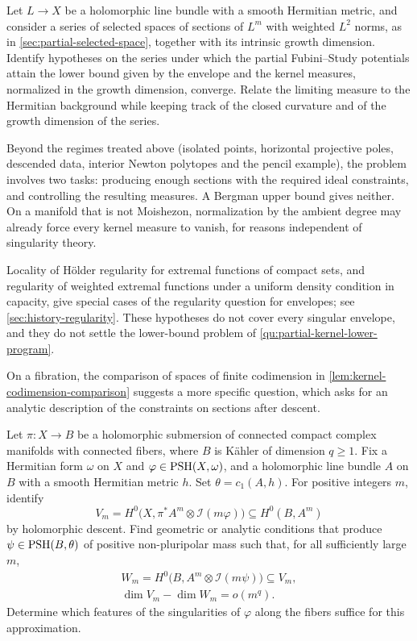 \begin{problem}\label{qu:partial-kernel-lower-program}
Let $L\to X$ be a holomorphic line bundle with a smooth Hermitian metric, and consider a series of selected spaces of sections of $L^m$ with weighted $L^2$ norms, as in \cref{sec:partial-selected-space}, together with its intrinsic growth dimension. Identify hypotheses on the series under which the partial Fubini--Study potentials attain the lower bound given by the envelope and the kernel measures, normalized in the growth dimension, converge. Relate the limiting measure to the Hermitian background while keeping track of the closed curvature and of the growth dimension of the series.
\end{problem}

Beyond the regimes treated above (isolated points, horizontal projective poles, descended data, interior Newton polytopes and the pencil example), the problem involves two tasks: producing enough sections with the required ideal constraints, and controlling the resulting measures. A Bergman upper bound gives neither. On a manifold that is not Moishezon, normalization by the ambient degree may already force every kernel measure to vanish, for reasons independent of singularity theory.

Locality of H\"older regularity for extremal functions of compact sets, and regularity of weighted extremal functions under a uniform density condition in capacity, give special cases of the regularity question for envelopes; see \cref{sec:history-regularity}. These hypotheses do not cover every singular envelope, and they do not settle the lower-bound problem of \cref{qu:partial-kernel-lower-program}.

On a fibration, the comparison of spaces of finite codimension in \cref{lem:kernel-codimension-comparison} suggests a more specific question, which asks for an analytic description of the constraints on sections after descent.

\begin{problem}\label{qu:fiber-selected-approximation}
Let $\pi\colon X\to B$ be a holomorphic submersion of connected compact complex manifolds with connected fibers, where $B$ is K\"ahler of dimension $q\geq1$. Fix a Hermitian form $\omega$ on $X$ and $\varphi\in\mathrm{PSH}(X,\omega)$, and a holomorphic line bundle $A$ on $B$ with a smooth Hermitian metric $h$. Set $\theta=c_1(A,h)$. For positive integers $m$, identify
\[
 V_m=H^0\bigl(X,\pi^*A^m\otimes\mathcal I(m\varphi)\bigr)
          \subseteq H^0(B,A^m)
\]
by holomorphic descent. Find geometric or analytic conditions that produce $\psi\in\mathrm{PSH}(B,\theta)$ of positive non-pluripolar mass such that, for all sufficiently large $m$,
\[
 \begin{gathered}
 W_m=H^0\bigl(B,A^m\otimes\mathcal I(m\psi)\bigr)\subseteq V_m,\\
 \dim V_m-\dim W_m=o(m^q).
 \end{gathered}
\]
Determine which features of the singularities of $\varphi$ along the fibers suffice for this approximation.
\end{problem}

